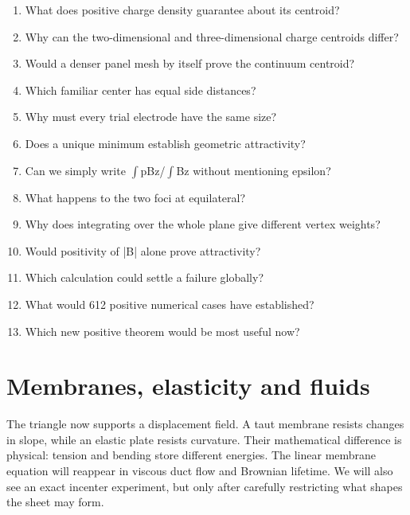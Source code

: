 \documentclass[11pt,oneside,openany]{book}
\begin{document}
\begin{enumerate}

\item\label{ex:17} What does positive charge density guarantee about its centroid?

\item\label{ex:18} Why can the two-dimensional and three-dimensional charge centroids differ?

\item\label{ex:19} Would a denser panel mesh by itself prove the continuum centroid?

\item\label{ex:20} Which familiar center has equal side distances?

\item\label{ex:21} Why must every trial electrode have the same size?

\item\label{ex:23} Does a unique minimum establish geometric attractivity?

\item\label{ex:24} Can we simply write \ensuremath{\int}pBz/\ensuremath{\int}Bz without mentioning epsilon?

\item\label{ex:25} What happens to the two foci at equilateral?

\item\label{ex:26} Why does integrating over the whole plane give different vertex weights?

\item\label{ex:27} Would positivity of |B| alone prove attractivity?

\item\label{ex:28} Which calculation could settle a failure globally?

\item\label{ex:29} What would 612 positive numerical cases have established?

\item\label{ex:30} Which new positive theorem would be most useful now?

\end{enumerate}

\chapter{Membranes, elasticity and fluids}\label{ch:3}

The triangle now supports a displacement field. A taut membrane resists changes in slope, while an elastic plate resists curvature. Their mathematical difference is physical: tension and bending store different energies. The linear membrane equation will reappear in viscous duct flow and Brownian lifetime. We will also see an exact incenter experiment, but only after carefully restricting what shapes the sheet may form.
\end{document}
